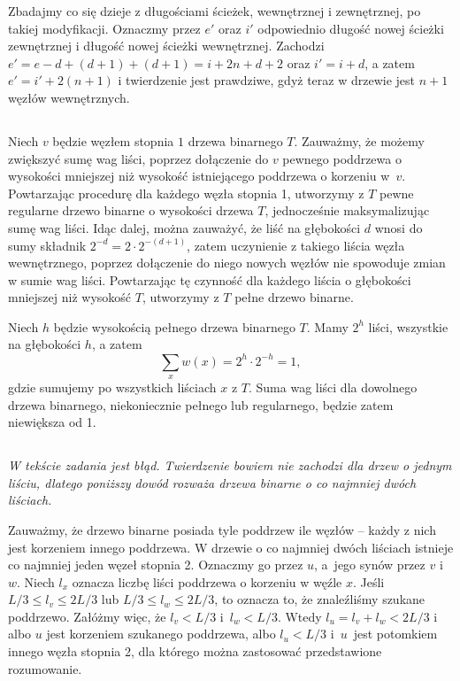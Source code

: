 Zbadajmy co się dzieje z długościami ścieżek, wewnętrznej i zewnętrznej, po takiej modyfikacji. Oznaczmy przez $e'$ oraz $i'$ odpowiednio długość nowej ścieżki zewnętrznej i długość nowej ścieżki wewnętrznej. Zachodzi $e'=e-d+(d+1)+(d+1)=i+2n+d+2$ oraz $i'=i+d$, a zatem $e'=i'+2(n+1)$ i twierdzenie jest prawdziwe, gdyż teraz w drzewie jest $n+1$ węzłów wewnętrznych.

\subsection{} %
Niech $v$ będzie węzłem stopnia $1$ drzewa binarnego $T$. Zauważmy, że możemy zwiększyć sumę wag liści, poprzez dołączenie do $v$ pewnego poddrzewa o wysokości mniejszej niż wysokość istniejącego poddrzewa o korzeniu w~$v$. Powtarzając procedurę dla każdego węzła stopnia 1, utworzymy z $T$ pewne regularne drzewo binarne o wysokości drzewa $T$, jednocześnie maksymalizując sumę wag liści. Idąc dalej, można zauważyć, że liść na głębokości $d$ wnosi do sumy składnik $2^{-d}=2\cdot2^{-(d+1)}$, zatem uczynienie z takiego liścia węzła wewnętrznego, poprzez dołączenie do niego nowych węzłów nie spowoduje zmian w sumie wag liści. Powtarzając tę czynność dla każdego liścia o głębokości mniejszej niż wysokość $T$, utworzymy z $T$ pełne drzewo binarne.

Niech $h$ będzie wysokością pełnego drzewa binarnego $T$. Mamy $2^h$ liści, wszystkie na głębokości $h$, a zatem
\[
	\sum_{x}w(x) = 2^h\cdot2^{-h} = 1,
\]
gdzie sumujemy po wszystkich liściach $x$ z $T$. Suma wag liści dla dowolnego drzewa binarnego, niekoniecznie pełnego lub regularnego, będzie zatem niewiększa od 1.

\subsection{} %
\noindent\emph{W tekście zadania jest błąd. Twierdzenie bowiem nie zachodzi dla drzew o jednym liściu, dlatego poniższy dowód rozważa drzewa binarne o co najmniej dwóch liściach.}
\bigskip

Zauważmy, że drzewo binarne posiada tyle poddrzew ile węzłów -- każdy z nich jest korzeniem innego poddrzewa. W drzewie o co najmniej dwóch liściach istnieje co najmniej jeden węzeł stopnia 2. Oznaczmy go przez $u$, a~jego synów przez $v$ i $w$.  Niech $l_x$ oznacza liczbę liści poddrzewa o korzeniu w węźle $x$. Jeśli $L/3\le l_v\le 2L/3$ lub $L/3\le l_w\le 2L/3$, to oznacza to, że znaleźliśmy szukane poddrzewo. Załóżmy więc, że $l_v<L/3$ i~$l_w<L/3$. Wtedy $l_u=l_v+l_w<2L/3$ i albo $u$ jest korzeniem szukanego poddrzewa, albo $l_u<L/3$ i~$u$~jest potomkiem innego węzła stopnia 2, dla którego można zastosować przedstawione rozumowanie.

